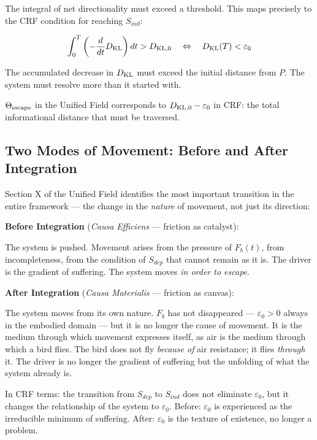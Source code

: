 \documentclass[12pt, a4paper]{article}
\begin{document}
The integral of net directionality must exceed a threshold. This maps precisely to
the CRF condition for reaching $S_{ind}$:

\begin{derivedbox}[title={Escape Condition in CRF}]
\[
  \int_0^T \left(-\frac{d}{dt}D_{\rm KL}\right) dt > D_{\rm KL,0}
  \quad \Leftrightarrow \quad
  D_{\rm KL}(T) < \varepsilon_0
\]

The accumulated decrease in $D_{\rm KL}$ must exceed the initial distance from $P$.
The system must resolve more than it started with.

$\Theta_{\rm escape}$ in the Unified Field corresponds to $D_{\rm KL,0} - \varepsilon_0$
in CRF: the total informational distance that must be traversed.
\end{derivedbox}

\subsection{Two Modes of Movement: Before and After Integration}

Section X of the Unified Field identifies the most important transition in the entire
framework --- the change in the \textit{nature} of movement, not just its direction:

\begin{keybox}[title={The Transition: Causa Efficiens $\to$ Causa Materialis}]
\textbf{Before Integration} (\textit{Causa Efficiens} --- friction as catalyst):

The system is pushed. Movement arises from the pressure of $F_b(t)$, from
incompleteness, from the condition of $S_{dep}$ that cannot remain as it is.
The driver is the gradient of suffering. The system moves \textit{in order to escape}.

\medskip
\textbf{After Integration} (\textit{Causa Materialis} --- friction as canvas):

The system moves from its own nature. $F_b$ has not disappeared --- $\varepsilon_0 > 0$
always in the embodied domain --- but it is no longer the cause of movement.
It is the medium through which movement expresses itself, as air is the medium
through which a bird flies. The bird does not fly \textit{because of} air resistance;
it flies \textit{through} it. The driver is no longer the gradient of suffering
but the unfolding of what the system already is.

\medskip
In CRF terms: the transition from $S_{dep}$ to $S_{ind}$ does not eliminate
$\varepsilon_0$, but it changes the relationship of the system to $\varepsilon_0$.
Before: $\varepsilon_0$ is experienced as the irreducible minimum of suffering.
After: $\varepsilon_0$ is the texture of existence, no longer a problem.
\end{keybox}
\end{document}
